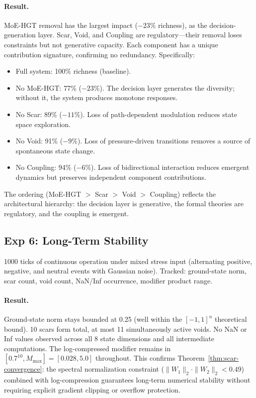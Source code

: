 \documentclass[11pt]{article}
\begin{document}
\paragraph{Result.} MoE-HGT removal has the largest impact ($-23\%$ richness), as the decision-generation layer. Scar, Void, and Coupling are regulatory---their removal loses constraints but not generative capacity. Each component has a unique contribution signature, confirming no redundancy. Specifically:
\begin{itemize}
\item Full system: 100\% richness (baseline).
\item No MoE-HGT: 77\% ($-23\%$). The decision layer generates the diversity; without it, the system produces monotone responses.
\item No Scar: 89\% ($-11\%$). Loss of path-dependent modulation reduces state space exploration.
\item No Void: 91\% ($-9\%$). Loss of pressure-driven transitions removes a source of spontaneous state change.
\item No Coupling: 94\% ($-6\%$). Loss of bidirectional interaction reduces emergent dynamics but preserves independent component contributions.
\end{itemize}
The ordering (MoE-HGT $>$ Scar $>$ Void $>$ Coupling) reflects the architectural hierarchy: the decision layer is generative, the formal theories are regulatory, and the coupling is emergent.

\subsection{Exp 6: Long-Term Stability}

1000 ticks of continuous operation under mixed stress input (alternating positive, negative, and neutral events with Gaussian noise). Tracked: ground-state norm, scar count, void count, NaN/Inf occurrence, modifier product range.

\paragraph{Result.} Ground-state norm stays bounded at 0.25 (well within the $[-1,1]^n$ theoretical bound). 10 scars form total, at most 11 simultaneously active voids. No NaN or Inf values observed across all 8 state dimensions and all intermediate computations. The log-compressed modifier remains in $[0.7^{10}, M_{\max}] = [0.028, 5.0]$ throughout. This confirms Theorem~\ref{thm:scar-convergence}: the spectral normalization constraint ($\|W_1\|_2 \cdot \|W_2\|_2 < 0.49$) combined with log-compression guarantees long-term numerical stability without requiring explicit gradient clipping or overflow protection.
\end{document}
